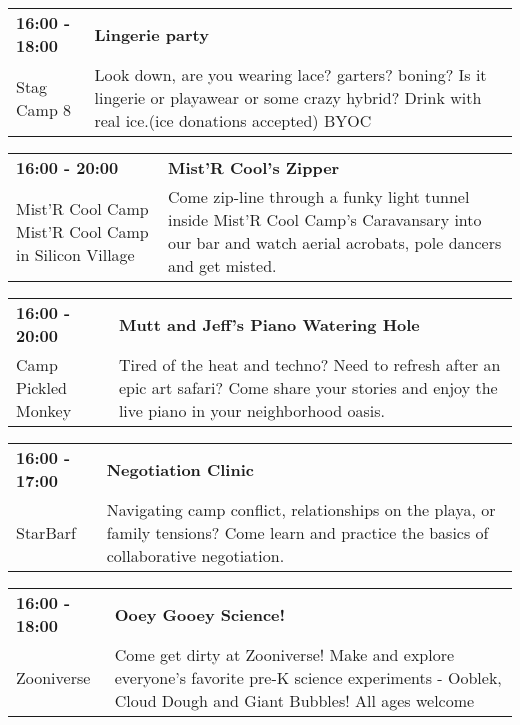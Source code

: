 \begin{tabular}{ p{1in} p{2.2in} }
    \textbf{16:00 - 18:00} & \textbf{Lingerie party} \\
    Stag Camp 8 \newline  & Look down, are you wearing lace? garters? boning? Is it lingerie or playawear or some crazy hybrid? Drink with real ice.(ice donations accepted) BYOC \\
    \hline 
\end{tabular}
    
\begin{tabular}{ p{1in} p{2.2in} }
    \textbf{16:00 - 20:00} & \textbf{Mist'R Cool's Zipper} \\
    Mist'R Cool Camp \newline Mist'R Cool Camp in Silicon Village & Come zip-line through a funky light tunnel inside Mist'R Cool Camp's Caravansary into our bar and watch aerial acrobats, pole dancers and get misted. \\
    \hline 
\end{tabular}
    
\begin{tabular}{ p{1in} p{2.2in} }
    \textbf{16:00 - 20:00} & \textbf{Mutt and Jeff's Piano Watering Hole} \\
    Camp Pickled Monkey \newline  & Tired of the heat and techno? Need to refresh after an epic art safari? Come share your stories and enjoy the live piano in your neighborhood oasis. \\
    \hline 
\end{tabular}
    
\begin{tabular}{ p{1in} p{2.2in} }
    \textbf{16:00 - 17:00} & \textbf{Negotiation Clinic} \\
    StarBarf \newline  & Navigating camp conflict, relationships on the playa, or family tensions? Come learn and practice the basics of collaborative negotiation. \\
    \hline 
\end{tabular}
    
\begin{tabular}{ p{1in} p{2.2in} }
    \textbf{16:00 - 18:00} & \textbf{Ooey Gooey Science!} \\
    Zooniverse \newline  & Come get dirty at Zooniverse! Make and explore everyone's favorite pre-K science experiments - Ooblek, Cloud Dough and Giant Bubbles! All ages welcome \\
    \hline 
\end{tabular}
    
